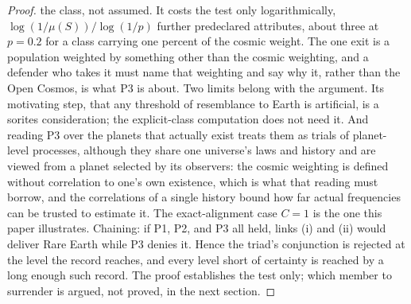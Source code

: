 \begin{proof}
the class, not assumed. It costs the test only logarithmically, $\log(1/\mu(S))/\log(1/p)$ further predeclared attributes, about three at $p = 0.2$ for a class carrying one percent of the cosmic weight. The one exit is a population weighted by something other than the cosmic weighting, and a defender who takes it must name that weighting and say why it, rather than the Open Cosmos, is what P3 is about. Two limits belong with the argument. Its motivating step, that any threshold of resemblance to Earth is artificial, is a sorites consideration; the explicit-class computation does not need it. And reading P3 over the planets that actually exist treats them as trials of planet-level processes, although they share one universe's laws and history and are viewed from a planet selected by its observers: the cosmic weighting is defined without correlation to one's own existence, which is what that reading must borrow, and the correlations of a single history bound how far actual frequencies can be trusted to estimate it. The exact-alignment case $C = 1$ is the one this paper illustrates. Chaining: if P1, P2, and P3 all held, links (i) and (ii) would deliver Rare Earth while P3 denies it. Hence the triad's conjunction is rejected at the level the record reaches, and every level short of certainty is reached by a long enough such record. The proof establishes the test only; which member to surrender is argued, not proved, in the next section.

\end{proof}
